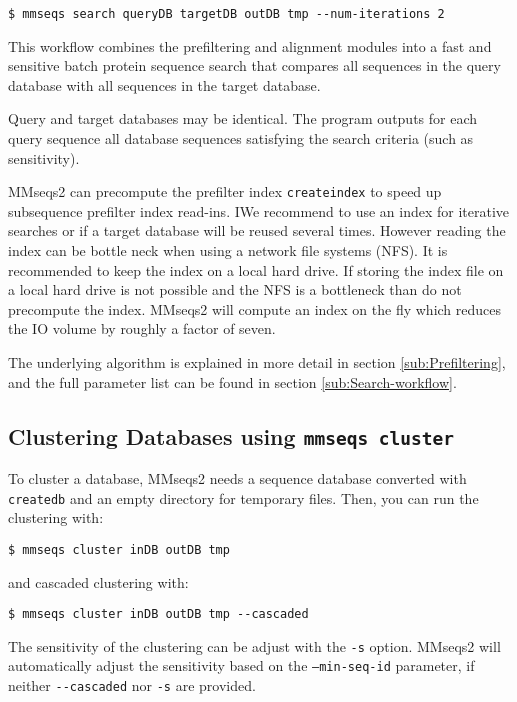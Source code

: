 \documentclass[11pt,a4paper]{scrreprt}
\begin{document}
\begin{verbatim}
$ mmseqs search queryDB targetDB outDB tmp --num-iterations 2
\end{verbatim}

This workflow combines the prefiltering and alignment modules into a fast and sensitive batch protein sequence search that compares all sequences in the query database with all sequences in the target database.

Query and target databases may be identical. The program outputs for each query sequence all database sequences satisfying the search criteria (such as sensitivity).

MMseqs2 can precompute the prefilter index \texttt{createindex} to speed up subsequence prefilter index read-ins. IWe recommend to use an index for iterative searches or if a target database will be reused several times. However reading the index can be bottle neck when using a network file systems (NFS). It is recommended to keep the index on a local hard drive. If storing the index file on a local hard drive is not possible and the NFS is a bottleneck than do not precompute the index. MMseqs2 will compute an index on the fly which reduces the IO volume by roughly a factor of seven.

The underlying algorithm is explained in more detail in section \ref{sub:Prefiltering}, and the full parameter list can be found in section \ref{sub:Search-workflow}.
\subsection{Clustering Databases using \texttt{mmseqs cluster}} \label{sub:Clustering}
To cluster a database, MMseqs2 needs a sequence database converted with \texttt{createdb} and an empty directory for temporary files. Then, you can run the clustering with:

\begin{verbatim}
$ mmseqs cluster inDB outDB tmp
\end{verbatim}

and cascaded clustering with:

\begin{verbatim}
$ mmseqs cluster inDB outDB tmp --cascaded
\end{verbatim}

The sensitivity of the clustering can be adjust with the \texttt{-s} option. MMseqs2 will automatically adjust the sensitivity based on the \texttt{--min-seq-id} parameter, if neither \texttt{-{}-cascaded} nor \texttt{-s} are  provided. 
\end{document}
